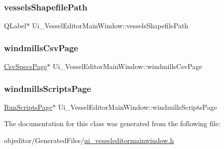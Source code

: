 \subsubsection{\texorpdfstring{vesselsShapefilePath}{vesselsShapefilePath}}
{\footnotesize\ttfamily Q\+Label$\ast$ Ui\+\_\+\+Vessel\+Editor\+Main\+Window\+::vessels\+Shapefile\+Path}

\mbox{\label{class_ui___vessel_editor_main_window_a24d095867c9dee993b311fb45e045430}} 
\subsubsection{\texorpdfstring{windmillsCsvPage}{windmillsCsvPage}}
{\footnotesize\ttfamily \mbox{\hyperlink{class_csv_specs_page}{Csv\+Specs\+Page}}$\ast$ Ui\+\_\+\+Vessel\+Editor\+Main\+Window\+::windmills\+Csv\+Page}

\mbox{\label{class_ui___vessel_editor_main_window_aed9bf86859c6c6f27f2833edc4843f98}} 
\subsubsection{\texorpdfstring{windmillsScriptsPage}{windmillsScriptsPage}}
{\footnotesize\ttfamily \mbox{\hyperlink{class_run_scripts_page}{Run\+Scripts\+Page}}$\ast$ Ui\+\_\+\+Vessel\+Editor\+Main\+Window\+::windmills\+Scripts\+Page}



The documentation for this class was generated from the following file\+:\begin{DoxyCompactItemize}
\item 
objeditor/\+Generated\+Files/\mbox{\hyperlink{ui__vesseleditormainwindow_8h}{ui\+\_\+vesseleditormainwindow.\+h}}\end{DoxyCompactItemize}
